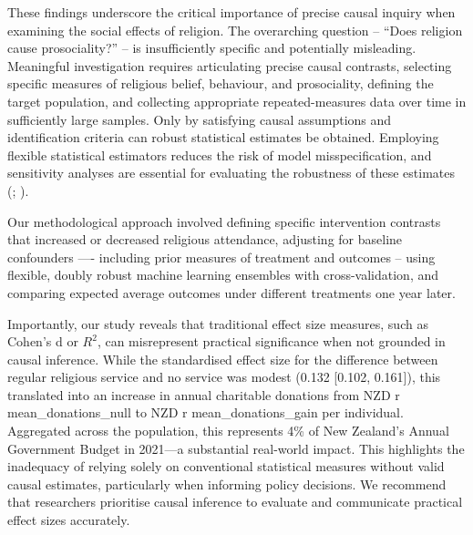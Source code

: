 \documentclass[
  single column]{article}
\begin{document}
These findings underscore the critical importance of precise causal
inquiry when examining the social effects of religion. The overarching
question -- ``Does religion cause prosociality?'' -- is insufficiently
specific and potentially misleading. Meaningful investigation requires
articulating precise causal contrasts, selecting specific measures of
religious belief, behaviour, and prosociality, defining the target
population, and collecting appropriate repeated-measures data over time
in sufficiently large samples. Only by satisfying causal assumptions and
identification criteria can robust statistical estimates be obtained.
Employing flexible statistical estimators reduces the risk of model
misspecification, and sensitivity analyses are essential for evaluating
the robustness of these estimates
(;
).

Our methodological approach involved defining specific intervention
contrasts that increased or decreased religious attendance, adjusting
for baseline confounders ---- including prior measures of treatment and
outcomes -- using flexible, doubly robust machine learning ensembles
with cross-validation, and comparing expected average outcomes under
different treatments one year later.

Importantly, our study reveals that traditional effect size measures,
such as Cohen's d or \(R^2\), can misrepresent practical significance
when not grounded in causal inference. While the standardised effect
size for the difference between regular religious service and no service
was modest (0.132 {[}0.102, 0.161{]}), this translated into an increase
in annual charitable donations from NZD r mean\_donations\_null to NZD r
mean\_donations\_gain per individual. Aggregated across the population,
this represents 4\% of New Zealand's Annual Government Budget in
2021---a substantial real-world impact. This highlights the inadequacy
of relying solely on conventional statistical measures without valid
causal estimates, particularly when informing policy decisions. We
recommend that researchers prioritise causal inference to evaluate and
communicate practical effect sizes accurately.
\end{document}
